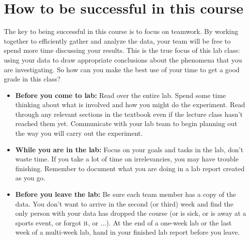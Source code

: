 \section*{How to be successful in this course}
The key to being successful in this course is to focus on teamwork.
By working together to efficiently gather and analyze the data, your team will be free to spend more time discussing your results.
This is the true focus of this lab class: using your data to draw appropriate conclusions about the phenomena that you are investigating.
So how can you make the best use of your time to get a good grade in this class?
\begin{itemize}
	\setlength\itemsep{2pt}
	\item \textbf{Before you come to lab:} Read over the entire lab.
	Spend some time thinking about what is involved and how you might do the experiment.
	Read through any relevant sections in the textbook even if the lecture class hasn't reached them yet.
	Communicate with your lab team to begin planning out the way you will carry out the experiment.
	\item \textbf{While you are in the lab:} Focus on your goals and tasks in the lab, don't waste time.
	If you take a lot of time on irrelevancies, you may have trouble finishing.
	Remember to document what you are doing in a lab report created as you go.
	\item \textbf{Before you leave the lab:} Be sure each team member has a copy of the data.
	You don't want to arrive in the second (or third) week and find the only person with your data has dropped the course (or is sick, or is away at a sports event, or forgot it, or ...).
	At the end of a one-week lab or the last week of a multi-week lab, hand in your finished lab report before you leave.
\end{itemize}

